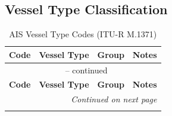 \subsection{Vessel Type Classification}

\begin{longtable}{clcl}
\caption{AIS Vessel Type Codes (ITU-R M.1371)} 
\label{tab:ais-vessel-types} \\
\toprule
\textbf{Code} & \textbf{Vessel Type} & \textbf{Group} & \textbf{Notes} \\
\midrule
\endfirsthead
\multicolumn{4}{c}{\tablename\ \thetable{} -- continued} \\
\toprule
\textbf{Code} & \textbf{Vessel Type} & \textbf{Group} & \textbf{Notes} \\
\midrule
\endhead
\midrule
\multicolumn{4}{r}{\textit{Continued on next page}} \\
\endfoot
\bottomrule
\endlastfoot


\end{longtable}
